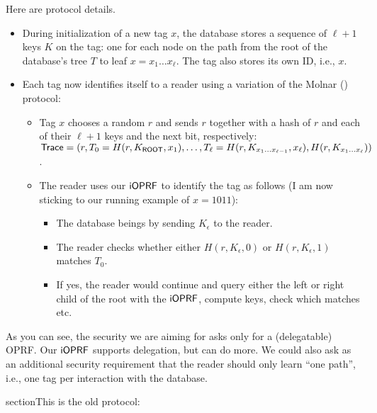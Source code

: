 \documentclass{article}
\begin{document}
Here are protocol details.
\begin{itemize}
  
\item During initialization of a new tag $x$, the database stores a
  sequence of $\ell+1$ keys $K$ on the tag: one for each node on the
  path from the root of the database's tree $T$ to leaf
  $x=x_1\ldots{}x_\ell$. The tag also stores its own ID, i.e., $x$.

\item Each tag now identifies itself to a reader using a variation of
  the Molnar () protocol:

  \begin{itemize}
  \item Tag $x$ chooses a random $r$ and sends $r$ together with a
    hash of $r$ and each of their $\ell+1$ keys and the next bit,
    respectively:
    $\mathsf{Trace}=(r,T_0=H(r,
    K_{\mathsf{ROOT}},x_1),\ldots,T_\ell=H(r,K_{x_1\ldots{}x_{\ell-1}},x_{\ell}),H(r,K_{x_1\ldots{}x_\ell}))$.

\item The reader uses our $\mathsf{i}\mathsf{OPRF}$ to identify the tag as follows (I am now sticking to our running example of $x=1011$):

 \begin{itemize}

 \item The database beings by sending $K_\epsilon$ to the reader.
   
  \item The reader checks whether either $H(r,K_\epsilon,0)$ or $H(r,K_\epsilon,1)$  matches
    $T_0$.

  \item If yes, the reader would continue and query either the left or
    right child of the root with the $\mathsf{i}\mathsf{OPRF}$, compute keys, check
    which matches etc.
\end{itemize}
  \end{itemize}
\end{itemize}

As you can see, the security we are aiming for asks only for a
(delegatable) OPRF. Our $\mathsf{i}\mathsf{OPRF}$ supports delegation, but can do more. We
could also ask as an additional security requirement that the reader
should only learn ``one path'', i.e., one tag per interaction with the
database. 


\newpage
section{This is the old protocol:}
\end{document}

